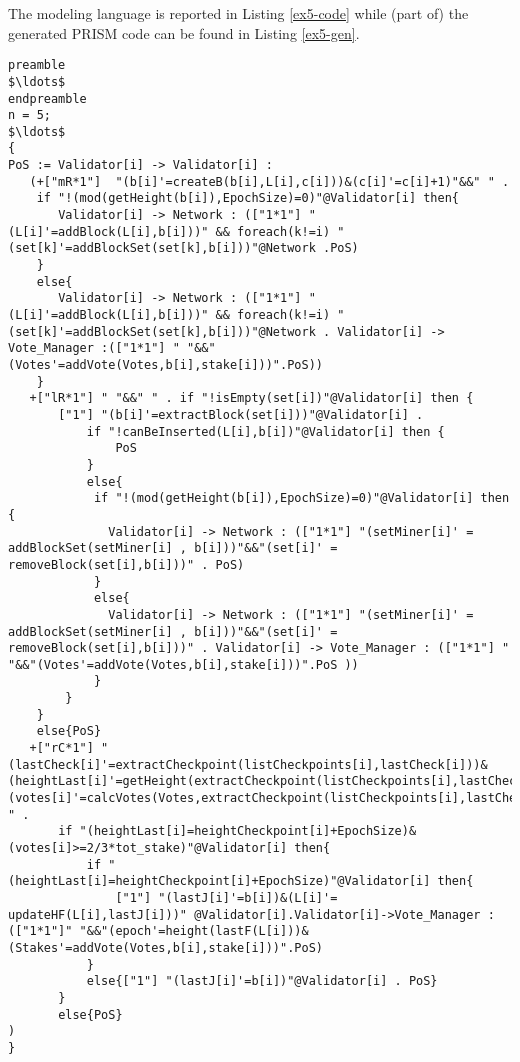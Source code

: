 The modeling language is reported in Listing \ref{ex5-code} while (part of) the generated PRISM code can be found in Listing \ref{ex5-gen}.
\begin{lstlisting}[style=chor-color,tabsize=2,breaklines=true, postbreak=\mbox{\textcolor{red}{$\hookrightarrow$}\space},	caption={Choreographic language for the Hybrid Casper Protocol.},captionpos=b,label={ex5-code}]
preamble
$\ldots$
endpreamble
n = 5;
$\ldots$
{
PoS := Validator[i] -> Validator[i] :
   (+["mR*1"]  "(b[i]'=createB(b[i],L[i],c[i]))&(c[i]'=c[i]+1)"&&" " .
	if "!(mod(getHeight(b[i]),EpochSize)=0)"@Validator[i] then{
	   Validator[i] -> Network : (["1*1"] "(L[i]'=addBlock(L[i],b[i]))" && foreach(k!=i) "(set[k]'=addBlockSet(set[k],b[i]))"@Network .PoS)
	}
	else{
	   Validator[i] -> Network : (["1*1"] "(L[i]'=addBlock(L[i],b[i]))" && foreach(k!=i) "(set[k]'=addBlockSet(set[k],b[i]))"@Network . Validator[i] -> Vote_Manager :(["1*1"] " "&&"(Votes'=addVote(Votes,b[i],stake[i]))".PoS))
	}
   +["lR*1"] " "&&" " . if "!isEmpty(set[i])"@Validator[i] then {
	   ["1"] "(b[i]'=extractBlock(set[i]))"@Validator[i] . 
		   if "!canBeInserted(L[i],b[i])"@Validator[i] then {
		       PoS
		   }
		   else{
			if "!(mod(getHeight(b[i]),EpochSize)=0)"@Validator[i] then {
			  Validator[i] -> Network : (["1*1"] "(setMiner[i]' = addBlockSet(setMiner[i] , b[i]))"&&"(set[i]' = removeBlock(set[i],b[i]))" . PoS)
			}
			else{
			  Validator[i] -> Network : (["1*1"] "(setMiner[i]' = addBlockSet(setMiner[i] , b[i]))"&&"(set[i]' = removeBlock(set[i],b[i]))" . Validator[i] -> Vote_Manager : (["1*1"] " "&&"(Votes'=addVote(Votes,b[i],stake[i]))".PoS ))
			}
		}
	}
	else{PoS}
   +["rC*1"] "(lastCheck[i]'=extractCheckpoint(listCheckpoints[i],lastCheck[i]))&(heightLast[i]'=getHeight(extractCheckpoint(listCheckpoints[i],lastCheck[i])))&(votes[i]'=calcVotes(Votes,extractCheckpoint(listCheckpoints[i],lastCheck[i])))"&&" " . 
	   if "(heightLast[i]=heightCheckpoint[i]+EpochSize)&(votes[i]>=2/3*tot_stake)"@Validator[i] then{
		   if "(heightLast[i]=heightCheckpoint[i]+EpochSize)"@Validator[i] then{
			   ["1"] "(lastJ[i]'=b[i])&(L[i]'= updateHF(L[i],lastJ[i]))" @Validator[i].Validator[i]->Vote_Manager :(["1*1"]" "&&"(epoch'=height(lastF(L[i]))&(Stakes'=addVote(Votes,b[i],stake[i]))".PoS)
		   }
		   else{["1"] "(lastJ[i]'=b[i])"@Validator[i] . PoS} 
	   }
	   else{PoS}
)								 
}	
\end{lstlisting}

